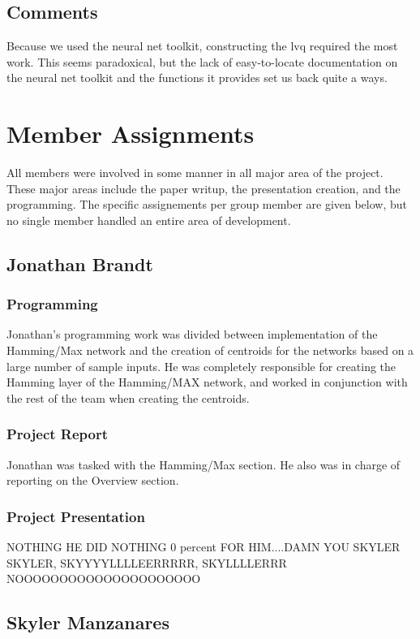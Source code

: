 \documentclass{article}
\begin{document}
\subsection{Comments}
Because we used the neural net toolkit, constructing the lvq required the most work. This seems paradoxical, but the lack of easy-to-locate documentation on the neural net toolkit and the functions it provides set us back quite a ways. 
 
\section{Member Assignments}
All members were involved in some manner in all major area of the project. These
major areas include the paper writup, the presentation creation, and the 
programming. The specific assignements per group member are given below, but no
single member handled an entire area of development.
\subsection{Jonathan Brandt}
\subsubsection{Programming}
Jonathan's programming work was divided between implementation of the 
Hamming/Max network and the creation of centroids for the networks based on a
large number of sample inputs. He was completely responsible for creating the Hamming layer of the Hamming/MAX network, and worked in conjunction with the rest of the team when creating the centroids. 

\subsubsection{Project Report}
Jonathan was tasked with the Hamming/Max section. He also was in charge of reporting on the Overview section.

\subsubsection{Project Presentation}
NOTHING HE DID NOTHING 0 percent FOR HIM....DAMN YOU SKYLER
SKYLER, SKYYYYLLLLEERRRRR, SKYLLLLERRR NOOOOOOOOOOOOOOOOOOOOO
\subsection{Skyler Manzanares}
\end{document}
